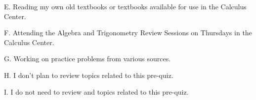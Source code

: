 \documentclass{ximera}
\begin{document}
\begin{problem}
\begin{problem}
    E. Reading my own old textbooks or textbooks available for use in the Calculus Center.

    \begin{multipleChoice}
    \end{multipleChoice}
    
\end{problem}
\begin{problem}
    
    F. Attending the Algebra and Trigonometry Review Sessions on Thursdays in the Calculus Center.

    \begin{multipleChoice}
    \end{multipleChoice}
    
\end{problem}
\begin{problem}
    
    G. Working on practice problems from various sources.

    \begin{multipleChoice}
    \end{multipleChoice}
    
\end{problem}
\begin{problem}
    
    H. I don't plan to review topics related to this pre-quiz.

    \begin{multipleChoice}
    \end{multipleChoice}
    
\end{problem}
\begin{problem}
    
    I. I do not need to review and topics related to this pre-quiz.

    \begin{multipleChoice}
    \end{multipleChoice}

\end{problem}
\end{problem}
\end{document}
